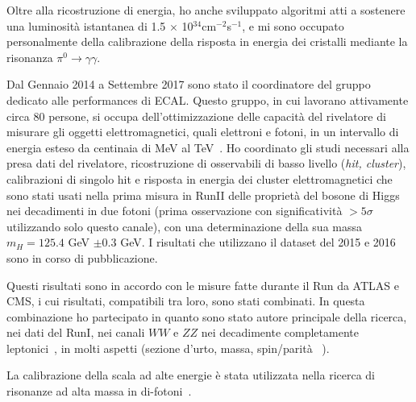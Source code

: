 \documentclass[a4paper,12pt,twoside]{article}
\begin{document}
{  Oltre alla ricostruzione di energia, ho anche sviluppato algoritmi
  atti a sostenere una luminosit\`a istantanea di 1.5 $\times$
  10$^{34}$cm$^{-2}$s$^{-1}$, e mi sono occupato personalmente della
  calibrazione della risposta in energia dei cristalli mediante la
  risonanza $\pi^0\to\gamma\gamma$.

  Dal Gennaio 2014 a Settembre 2017 sono stato il coordinatore del
  gruppo dedicato alle performances di ECAL. Questo gruppo, in cui
  lavorano attivamente circa 80 persone, si occupa dell'ottimizzazione
  delle capacit\`a del rivelatore di misurare gli oggetti
  elettromagnetici, quali elettroni e fotoni, in un intervallo di
  energia esteso da centinaia di MeV al
  TeV~. Ho
  coordinato gli studi necessari alla presa dati del rivelatore,
  ricostruzione di osservabili di basso livello ({\it hit, cluster}),
  calibrazioni di singolo hit e risposta in energia dei cluster
  elettromagnetici che sono stati usati nella prima misura in RunII
  delle propriet\`a del bosone di Higgs nei decadimenti in due fotoni
  (prima osservazione con significativit\`a $>5\sigma$ utilizzando
  solo questo canale), con una determinazione della sua massa
  $m_H=125.4$ GeV $\pm0.3$ GeV.  I risultati che utilizzano il dataset
  del 2015 e 2016 sono in corso di pubblicazione.

  Questi risultati sono in accordo con le misure fatte durante il Run
  da ATLAS e CMS, i cui risultati, compatibili tra loro, sono stati
  combinati. In questa combinazione ho partecipato in quanto sono
  stato autore principale della ricerca, nei dati del RunI, nei canali
  $WW$ e $ZZ$ nei decadimente completamente
  leptonici~, in molti
  aspetti (sezione d'urto, massa, spin/parit\`a
  ~).

  La calibrazione della scala ad alte
  energie \`e stata utilizzata nella ricerca di risonanze ad alta
  massa in di-fotoni~.

}
\end{document}
